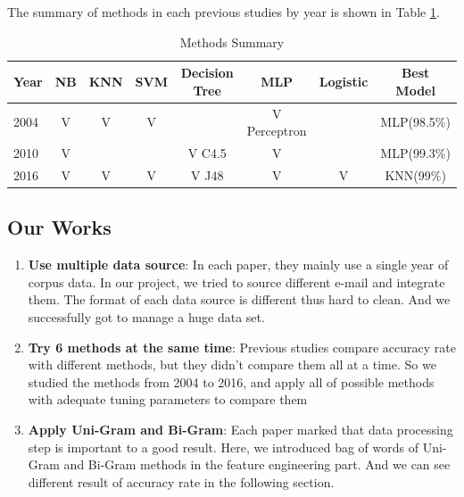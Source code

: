 The summary of methods in each previous studies by year is shown in Table \ref{method_summary}. 

\begin{table}[H]
	\centering
	\caption{Methods Summary}
	\label{method_summary}
	\begin{tabular}{lcccccc||c}
		\hline
		Year & NB & KNN   & SVM  & Decision Tree & MLP & Logistic & Best Model  \\ \hline
		2004\cite{MLinspam} &  V &  V    & V     &  \quad  & V Perceptron & \quad& MLP(98.5\%) \\
		2010\cite{EmailMLT} &  V & \quad & \quad & V C4.5  & V            & \quad& MLP(99.3\%) \\ 
		2016\cite{MailDectionCL} &  V &    V  & V     & V  J48  &   V & V      & KNN(99\%)  \\ \hline
	\end{tabular}
\end{table}





\subsection{Our Works}

\begin{enumerate}
	\item \textbf{Use multiple data source}: In each paper, they mainly use a single year of corpus data. In our project, we tried to source different e-mail and integrate them. The format of each data source is different thus hard to clean. And we successfully got to manage a huge data set. 

	\item \textbf{Try 6 methods at the same time}: Previous studies compare accuracy rate with different methods, but they didn't compare them all at a time. So we studied the methods from 2004 to 2016, and apply all of possible methods with adequate tuning parameters to compare them 

	\item \textbf{Apply Uni-Gram and Bi-Gram}: Each paper marked that data processing step is important to a good result. Here, we introduced bag of words of Uni-Gram and Bi-Gram methods in the feature engineering part. And we can see different result of accuracy rate in the following section.
\end{enumerate}
